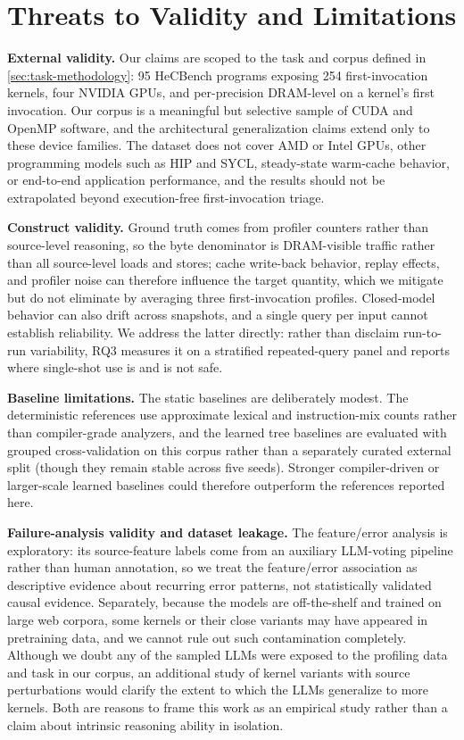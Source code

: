 \section{Threats to Validity and Limitations}
\label{sec:threats}

\noindent\textbf{External validity.}
Our claims are scoped to the task and corpus defined in \autoref{sec:task-methodology}: 95 HeCBench programs exposing 254 first-invocation kernels, four NVIDIA GPUs, and per-precision DRAM-level \rai on a kernel's first invocation.
Our corpus is a meaningful but selective sample of CUDA and OpenMP software, and the architectural generalization claims extend only to these device families.
The dataset does not cover AMD or Intel GPUs, other programming models such as HIP and SYCL, steady-state warm-cache behavior, or end-to-end application performance, and the results should not be extrapolated beyond execution-free first-invocation triage.

\noindent\textbf{Construct validity.}
Ground truth comes from profiler counters rather than source-level reasoning, so the byte denominator is DRAM-visible traffic rather than all source-level loads and stores; cache write-back behavior, replay effects, and profiler noise can therefore influence the target quantity, which we mitigate but do not eliminate by averaging three first-invocation profiles.
Closed-model behavior can also drift across snapshots, and a single query per input cannot establish reliability.
We address the latter directly: rather than disclaim run-to-run variability, RQ3 measures it on a stratified repeated-query panel and reports where single-shot use is and is not safe.

\noindent\textbf{Baseline limitations.}
The static baselines are deliberately modest.
The deterministic references use approximate lexical and instruction-mix counts rather than compiler-grade analyzers, and the learned tree baselines are evaluated with grouped cross-validation on this corpus rather than a separately curated external split (though they remain stable across five seeds).
Stronger compiler-driven or larger-scale learned baselines could therefore outperform the references reported here.

\noindent\textbf{Failure-analysis validity and dataset leakage.}
The feature/error analysis is exploratory: its source-feature labels come from an auxiliary LLM-voting pipeline rather than human annotation, so we treat the feature/error association as descriptive evidence about recurring error patterns, not statistically validated causal evidence.
Separately, because the models are off-the-shelf and trained on large web corpora, some kernels or their close variants may have appeared in pretraining data, and we cannot rule out such contamination completely.
Although we doubt any of the sampled LLMs were exposed to the profiling data and task in our corpus, an additional study of kernel variants with source perturbations would clarify the extent to which the LLMs generalize to more kernels.
Both are reasons to frame this work as an empirical study rather than a claim about intrinsic reasoning ability in isolation.
